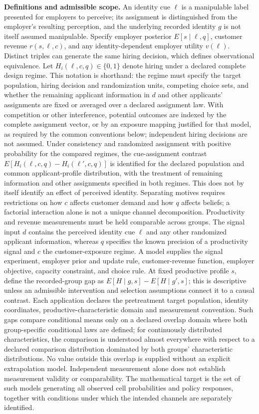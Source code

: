 \documentclass[11pt,a4paper]{article}
\begin{document}
\textbf{Definitions and admissible scope.} An identity cue \(\ell\) is a manipulable label presented for employers to perceive; its assignment is distinguished from the employer's resulting perception, and the underlying recorded identity \(g\) is not itself assumed manipulable. Specify employer posterior \(E[s\mid\ell,q]\), customer revenue \(r(s,\ell,c)\), and any identity-dependent employer utility \(v(\ell)\). Distinct triples can generate the same hiring decision, which defines observational equivalence. Let \(H_i(\ell,c,q)\in\{0,1\}\) denote hiring under a declared complete design regime. This notation is shorthand: the regime must specify the target population, hiring decision and randomization units, competing choice sets, and whether the remaining applicant information in \(d\) and other applicants' assignments are fixed or averaged over a declared assignment law. With competition or other interference, potential outcomes are indexed by the complete assignment vector, or by an exposure mapping justified for that model, as required by the common conventions below; independent hiring decisions are not assumed. Under consistency and randomized assignment with positive probability for the compared regimes, the cue-assignment contrast \(E[H_i(\ell,c,q)-H_i(\ell',c,q)]\) is identified for the declared population and common applicant-profile distribution, with the treatment of remaining information and other assignments specified in both regimes. This does not by itself identify an effect of perceived identity. Separating motives requires restrictions on how \(c\) affects customer demand and how \(q\) affects beliefs; a factorial interaction alone is not a unique channel decomposition. Productivity and revenue measurements must be held comparable across groups. The signal input \(d\) contains the perceived identity cue \(\ell\) and any other randomized applicant information, whereas \(q\) specifies the known precision of a productivity signal and \(c\) the customer-exposure regime. A model supplies the signal experiment, employer prior and update rule, customer-revenue function, employer objective, capacity constraint, and choice rule. At fixed productive profile \(s\), define the recorded-group gap as \(E[H\mid g,s]-E[H\mid g',s]\); this is descriptive unless an admissible intervention and selection assumptions connect it to a causal contrast. Each application declares the pretreatment target population, identity coordinates, productive-characteristic domain and measurement convention. Such gaps compare conditional means only on a declared overlap domain where both group-specific conditional laws are defined; for continuously distributed characteristics, the comparison is understood almost everywhere with respect to a declared comparison distribution dominated by both groups' characteristic distributions. No value outside this overlap is supplied without an explicit extrapolation model. Independent measurement alone does not establish measurement validity or comparability. The mathematical target is the set of such models generating all observed cell probabilities and policy responses, together with conditions under which the intended channels are separately identified.
\end{document}
